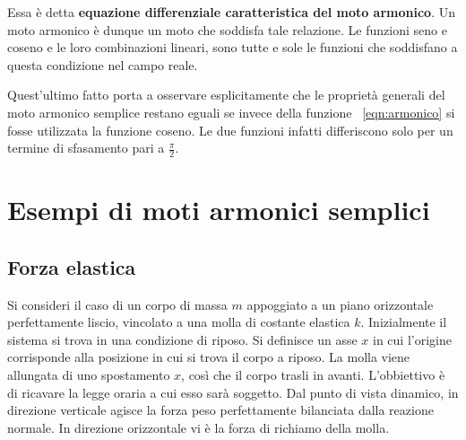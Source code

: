 \documentclass[10pt,a4paper]{book}
\begin{document}
\begin{figure}[ht]
\end{figure}
Essa è detta \textbf{equazione differenziale caratteristica del moto armonico}. Un moto armonico è dunque un moto che soddisfa tale relazione. Le funzioni seno e coseno e le loro combinazioni lineari, sono tutte e sole le funzioni che soddisfano a questa condizione nel campo reale.

Quest'ultimo fatto porta a osservare esplicitamente che le proprietà generali del moto armonico semplice restano eguali se invece della funzione ~\eqref{eqn:armonico} si fosse utilizzata la funzione coseno. Le due funzioni infatti differiscono solo per un termine di sfasamento pari a $\frac{\pi}{2}$.







































\section{Esempi di moti armonici semplici}

\subsection{Forza elastica}

Si consideri il caso di un corpo di massa $m$ appoggiato a un piano orizzontale perfettamente liscio, vincolato a una molla di costante elastica $k$. Inizialmente il sistema si trova in una condizione di riposo. Si definisce un asse $x$ in cui l'origine corrisponde alla posizione in cui si trova il corpo a riposo. La molla viene allungata di uno spostamento $x$, così che il corpo trasli in avanti. L'obbiettivo è di ricavare la legge oraria a cui esso sarà soggetto. Dal punto di vista dinamico, in direzione verticale agisce la forza peso perfettamente bilanciata dalla reazione normale. In direzione orizzontale vi è la forza di richiamo della molla.
\end{document}
